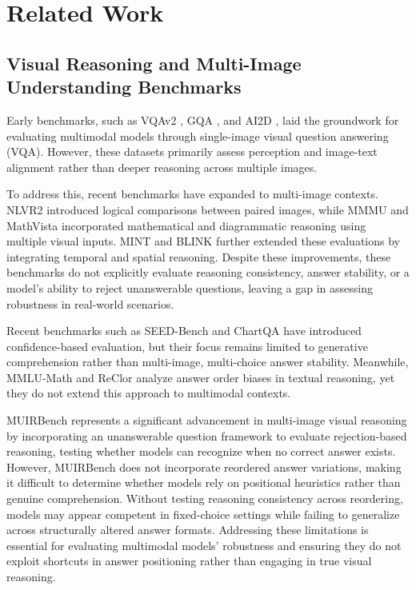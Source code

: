 \section{Related Work} \label{sec:related_work}



\subsection{Visual Reasoning and Multi-Image Understanding Benchmarks}
Early benchmarks, such as VQAv2 \cite{goyal2017making}, GQA \cite{hudson2019gqa}, and AI2D \cite{kembhavi2016diagram}, laid the groundwork for evaluating multimodal models through single-image visual question answering (VQA). However, these datasets primarily assess perception and image-text alignment rather than deeper reasoning across multiple images.

To address this, recent benchmarks have expanded to multi-image contexts. NLVR2 \cite{suhr2019nlvr2} introduced logical comparisons between paired images, while MMMU \cite{yue2024mmmu} and MathVista \cite{mathvista} incorporated mathematical and diagrammatic reasoning using multiple visual inputs. MINT \cite{wang2023mint} and BLINK \cite{fu2024blink} further extended these evaluations by integrating temporal and spatial reasoning. Despite these improvements, these benchmarks do not explicitly evaluate reasoning consistency, answer stability, or a model’s ability to reject unanswerable questions, leaving a gap in assessing robustness in real-world scenarios.

Recent benchmarks such as SEED-Bench \cite{li2023seedbench} and ChartQA \cite{masry2022chartqa} have introduced confidence-based evaluation, but their focus remains limited to generative comprehension rather than multi-image, multi-choice answer stability. Meanwhile, MMLU-Math \cite{mathmmlu2023} and ReClor \cite{yu2020reclor} analyze answer order biases in textual reasoning, yet they do not extend this approach to multimodal contexts.

MUIRBench \cite{wang2024muirbench} represents a significant advancement in multi-image visual reasoning by incorporating an unanswerable question framework to evaluate rejection-based reasoning, testing whether models can recognize when no correct answer exists. However, MUIRBench does not incorporate reordered answer variations, making it difficult to determine whether models rely on positional heuristics rather than genuine comprehension. Without testing reasoning consistency across reordering, models may appear competent in fixed-choice settings while failing to generalize across structurally altered answer formats. Addressing these limitations is essential for evaluating multimodal models’ robustness and ensuring they do not exploit shortcuts in answer positioning rather than engaging in true visual reasoning.


